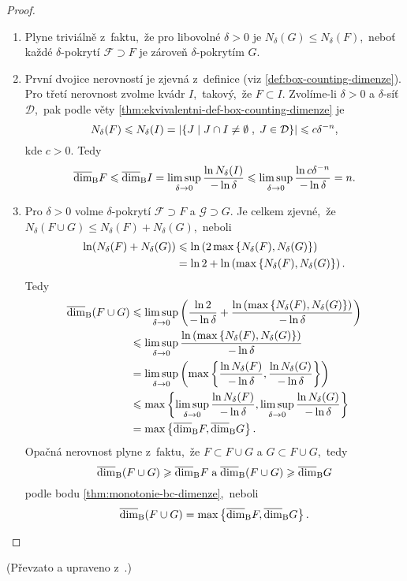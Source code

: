 \begin{proof}
    \begin{enumerate}[label=\textit{(\roman*)}]
        \item Plyne triviálně z~faktu,~že pro libovolné $\delta>0$ je $N_\delta(G)\leqslant N_\delta(F)$,~neboť každé $\delta$-pokrytí $\mathcal{F}\supset F$ je zároveň $\delta$-pokrytím $G$.
        \item První dvojice nerovností je zjevná z~definice (viz \ref{def:box-counting-dimenze}). Pro třetí nerovnost zvolme kvádr $I$,~takový,~že $F\subset I$. Zvolíme-li $\delta>0$ a $\delta$-síť $\mathcal{D}$,~pak podle věty \ref{thm:ekvivalentni-def-box-counting-dimenze} je
        \[N_\delta(F)\leqslant N_\delta(I)=\left|\left\{J\;\middle|\;J\cap I\neq\emptyset\;,\;J\in\mathcal{D}\right\}\right|\leqslant c\delta^{-n},\]
        kde $c>0$. Tedy
        \[\overline{\dim}_\textup{B}{F}\leqslant\overline{\dim}_\textup{B}{I}=\limsup_{\delta\to 0}\dfrac{\ln{N_\delta(I)}}{-\ln{\delta}}\leqslant\limsup_{\delta\to 0}\dfrac{\ln{c\delta^{-n}}}{-\ln{\delta}}=n.\]
        \item Pro $\delta>0$ volme $\delta$-pokrytí $\mathcal{F}\supset F$ a $\mathcal{G}\supset G$. Je celkem zjevné,~že $N_\delta(F\cup G)\leqslant N_\delta(F)+N_\delta(G)$,~neboli
        \begin{align*}
            \ln(N_\delta(F)+N_\delta(G))&\leqslant \ln\left(2\max\left\{N_\delta(F),N_\delta(G)\right\}\right)\\
            &=\ln{2}+\ln\left(\max\left\{N_\delta(F),N_\delta(G)\right\}\right).
        \end{align*}
        Tedy
        \begin{align*}
            \overline{\dim}_\textup{B}(F\cup G)&\leqslant\limsup_{\delta\to 0}\left(\dfrac{\ln{2}}{-\ln{\delta}}+\dfrac{\ln\left(\max\left\{N_\delta(F),N_\delta(G)\right\}\right)}{-\ln{\delta}}\right)\\
            &\leqslant\limsup_{\delta\to 0}\dfrac{\ln\left(\max\left\{N_\delta(F),N_\delta(G)\right\}\right)}{-\ln{\delta}}\\
            &=\limsup_{\delta\to 0}\left(\max\left\{\dfrac{\ln{N_\delta(F)}}{-\ln{\delta}},\dfrac{\ln{N_\delta(G)}}{-\ln{\delta}}\right\}\right)\\
            &\leqslant\max\left\{\limsup_{\delta\to 0}\dfrac{\ln{N_\delta(F)}}{-\ln{\delta}},\limsup_{\delta\to 0}\dfrac{\ln{N_\delta(G)}}{-\ln{\delta}}\right\}\\
            &=\max\left\{\overline{\dim}_\textup{B}{F},\overline{\dim}_\textup{B}{G}\right\}.
        \end{align*}
        Opačná nerovnost plyne z~faktu,~že $F\subset F\cup G$ a $G\subset F\cup G$,~tedy
        \[\overline{\dim}_\textup{B}(F\cup G)\geqslant\overline{\dim}_\textup{B}{F}\;\text{a}\;\overline{\dim}_\textup{B}(F\cup G)\geqslant\overline{\dim}_\textup{B}{G}\]
        podle bodu \ref{thm:monotonie-bc-dimenze},~neboli
        \[\overline{\dim}_\textup{B}(F\cup G)=\max\left\{\overline{\dim}_\textup{B}{F},\overline{\dim}_\textup{B}{G}\right\}.\]
    \end{enumerate}
\end{proof}
(Převzato a upraveno z~\citep[str. 35]{Falconer2014}.)

